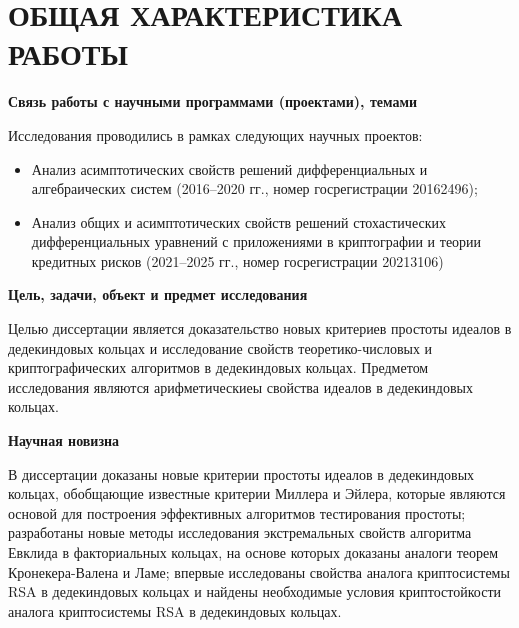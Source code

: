 \documentclass[_00_dissertation.tex]{subfiles}
\begin{document}
\onlyinsubfile{
    \renewcommand{\contentsname}{ОГЛАВЛЕНИЕ}
    \setcounter{tocdepth}{3}
    \tableofcontents
}

\chapter*{\MakeUppercase{Общая характеристика работы}}

\begin{center}
\textbf{Связь работы с научными программами (проектами), темами}
\end{center}

Исследования проводились в рамках следующих научных проектов:
\begin{itemize}
    \item Анализ асимптотических свойств решений дифференциальных и алгебраических систем (2016--2020 гг., номер госрегистрации 20162496);

    \item Анализ общих и асимптотических свойств решений стохастических дифференциальных уравнений с приложениями в криптографии и теории кредитных рисков (2021--2025 гг., номер госрегистрации 20213106)
\end{itemize}

\begin{center}
\textbf{Цель, задачи, объект и предмет исследования}
\end{center}

Целью диссертации является доказательство новых критериев простоты идеалов в дедекиндовых кольцах и исследование свойств теоретико-числовых и криптографических алгоритмов в дедекиндовых кольцах.
Предметом исследования являются арифметическиеы свойства идеалов в дедекиндовых кольцах.

\begin{center}
\textbf{Научная новизна}
\end{center}

В диссертации доказаны новые критерии простоты идеалов в дедекиндовых кольцах, обобщающие известные критерии Миллера и Эйлера, которые являются основой для построения эффективных алгоритмов тестирования простоты; разработаны новые методы исследования экстремальных свойств алгоритма Евклида в факториальных кольцах, на основе которых доказаны аналоги теорем Кронекера-Валена и Ламе; впервые исследованы свойства аналога криптосистемы RSA в дедекиндовых кольцах и найдены необходимые условия криптостойкости аналога криптосистемы RSA в дедекиндовых кольцах.
\end{document}
